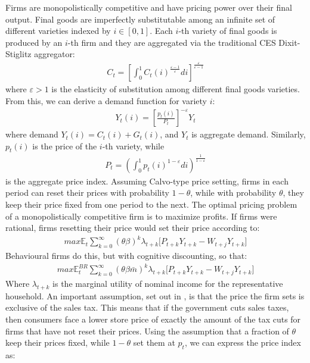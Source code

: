 \documentclass[11pt]{article}
\newcommand{\bb}{\bigbreak\noindent}
\begin{document}
\begin{spacing}{2}
Firms are monopolistically competitive and have pricing power over their final output. Final goods are imperfectly substitutable among an infinite set of different varieties indexed by \(i \in [0, 1]\). Each \(i\)-th variety of final goods is produced by an \(i\)-th firm and they are aggregated via the traditional CES Dixit-Stiglitz aggregator:
\begin{align}
	C_t = \left[ \int_0^1 C_t(i)^{\frac{\varepsilon-1}{\varepsilon}} di \right]^{\frac{\varepsilon}{\varepsilon-1}}
\end{align}
where \(\varepsilon > 1\) is the elasticity of substitution among different final goods varieties. From this, we can derive a demand function for variety \(i\):
\begin{align}
	Y_t(i) = \left[ \frac{p_t(i)}{P_t} \right]^{-\varepsilon} Y_t
\end{align}
where demand \(Y_t(i) = C_t(i) + G_t(i)\), and \(Y_t\) is aggregate demand. Similarly, \(p_t(i)\) is the price of the \(i\)-th variety, while
\begin{align}
	P_t = \left( \int_0^1 p_t(i)^{1-\varepsilon} di \right)^{\frac{1}{1-\varepsilon}}
\end{align}
is the aggregate price index.
\bb
Assuming Calvo-type price setting, firms in each period can reset their prices with probability \(1 - \theta\), while with probability \(\theta\), they keep their price fixed from one period to the next. The optimal pricing problem of a monopolistically competitive firm is to maximize profits. If firms were rational, firms resetting their price would set their price according to:
\bb
\begin{align}
	max\mathbb{E}_t \sum_{k=0}^{\infty} (\theta \beta)^k \lambda_{t+k} \big[P_{t+k}Y_{t+k} - W_{t+j}Y_{t+k} \big] 
\end{align}
Behavioural firms do this, but with cognitive discounting, so that:
\begin{align}
	max\mathbb{E}_t^{BR} \sum_{k=0}^{\infty} (\theta \beta \bar{m})^k \lambda_{t+k} \big[P_{t+k}Y_{t+k} - W_{t+j}Y_{t+k} \big] 
\end{align}
Where $\lambda_{t+k}$ is the marginal utility of nominal income for the representative household. An important assumption, set out in \cite{eggertsson2011fiscal}, is that the price the firm sets is exclusive of the sales tax. This means that if the government cuts sales taxes, then consumers face a lower store price of exactly the amount of the tax cuts for firms that have not reset their prices.
\bb
Using the assumption that a fraction of $\theta$ keep their prices fixed, while $1 - \theta$ set them at $p_t$, we can express the price index as:

\end{spacing}
\end{document}
